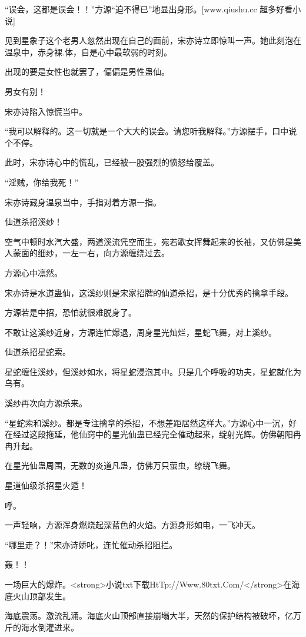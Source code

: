 
\begin{this_body}

“误会，这都是误会！！”方源“迫不得已”地显出身形。[www.qiushu.cc 超多好看小说]

见到星象子这个老男人忽然出现在自己的面前，宋亦诗立即惊叫一声。她此刻泡在温泉中，赤身裸.体，自是心中最软弱的时刻。

出现的要是女性也就罢了，偏偏是男性蛊仙。

男女有别！

宋亦诗陷入惊慌当中。

“我可以解释的。这一切就是一个大大的误会。请您听我解释。”方源摆手，口中说个不停。

此时，宋亦诗心中的慌乱，已经被一股强烈的愤怒给覆盖。

“淫贼，你给我死！”

宋亦诗藏身温泉当中，手指对着方源一指。

仙道杀招溪纱！

空气中顿时水汽大盛，两道溪流凭空而生，宛若歌女挥舞起来的长袖，又仿佛是美人蒙面的细纱，一左一右，向方源缠绕过去。

方源心中凛然。

宋亦诗是水道蛊仙，这溪纱则是宋家招牌的仙道杀招，是十分优秀的擒拿手段。

方源若是中招，恐怕就很难脱身了。

不敢让这溪纱近身，方源连忙爆退，周身星光灿烂，星蛇飞舞，对上溪纱。

仙道杀招星蛇索。

星蛇缠住溪纱，但溪纱如水，将星蛇浸泡其中。只是几个呼吸的功夫，星蛇就化为乌有。

溪纱再次向方源杀来。

“星蛇索和溪纱。都是专注擒拿的杀招，不想差距居然这样大。”方源心中一沉，好在经过这段拖延，他仙窍中的星光仙蛊已经完全催动起来，绽射光辉。仿佛朝阳冉冉升起。

在星光仙蛊周围，无数的炎道凡蛊，仿佛万只萤虫，缭绕飞舞。

星道仙级杀招星火遁！

呼。

一声轻响，方源浑身燃烧起深蓝色的火焰。方源身形如电，一飞冲天。

“哪里走？！”宋亦诗娇叱，连忙催动杀招阻拦。

轰！！

一场巨大的爆炸。<strong>小说txt下载HtTp://Www.80txt.Com/</strong>在海底火山顶部发生。

海底震荡。激流乱涌。海底火山顶部直接崩塌大半，天然的保护结构被破坏，亿万斤的海水倒灌进来。


\end{this_body}
